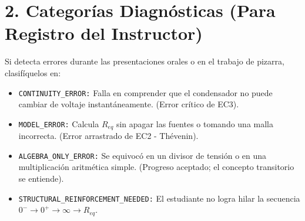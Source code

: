 \documentclass[11pt, a4paper]{article}
\begin{document}
\section*{2. Categorías Diagnósticas (Para Registro del Instructor)}
Si detecta errores durante las presentaciones orales o en el trabajo de pizarra, clasifíquelos en:
\begin{itemize}
    \item \texttt{CONTINUITY\_ERROR:} Falla en comprender que el condensador no puede cambiar de voltaje instantáneamente. (Error crítico de EC3).
    \item \texttt{MODEL\_ERROR:} Calcula $R_{eq}$ sin apagar las fuentes o tomando una malla incorrecta. (Error arrastrado de EC2 - Thévenin).
    \item \texttt{ALGEBRA\_ONLY\_ERROR:} Se equivocó en un divisor de tensión o en una multiplicación aritmética simple. (Progreso aceptado; el concepto transitorio se entiende).
    \item \texttt{STRUCTURAL\_REINFORCEMENT\_NEEDED:} El estudiante no logra hilar la secuencia $0^- \to 0^+ \to \infty \to R_{eq}$.
\end{itemize}
\end{document}
